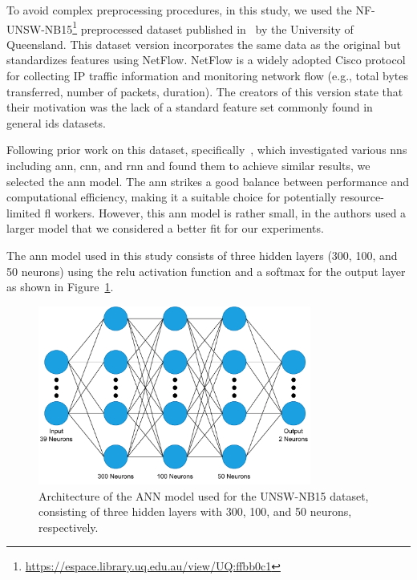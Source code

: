 To avoid complex preprocessing procedures, in this study, we used the NF-UNSW-NB15\footnote{\url{https://espace.library.uq.edu.au/view/UQ:ffbb0c1}} preprocessed dataset published in~\cite{nfunswnb15} by the University of Queensland. This dataset version incorporates the same data as the original but standardizes features using NetFlow. NetFlow is a widely adopted Cisco protocol for collecting IP traffic information and monitoring network flow (e.g., total bytes transferred, number of packets, duration). The creators of this version state that their motivation was the lack of a standard feature set commonly found in general \ac{ids} datasets.

Following prior work on this dataset, specifically~\cite{abou2020evaluation}, which investigated various \acp{nn} including \ac{ann}, \ac{cnn}, and \ac{rnn} and found them to achieve similar results, we selected the \ac{ann} model. The \ac{ann} strikes a good balance between performance and computational efficiency, making it a suitable choice for potentially resource-limited \ac{fl} workers. However, this \ac{ann} model is rather small, in \cite{abou2020investigating} the authors used a larger model that we considered a better fit for our experiments. 

The \ac{ann} model used in this study consists of three hidden layers (300, 100, and 50 neurons) using the \ac{relu} activation function and a softmax for the output layer as shown in Figure~\ref{fig:unws_nn}. 

\begin{figure}[!htb]
    \centering
    \includegraphics[width=0.8\textwidth]{figs/unsw_nn.pdf}
    \caption[UNSW-NB15 dataset model architecture]{Architecture of the ANN model used for the UNSW-NB15 dataset, consisting of three hidden layers with 300, 100, and 50 neurons, respectively.}
    \label{fig:unws_nn}
\end{figure}

